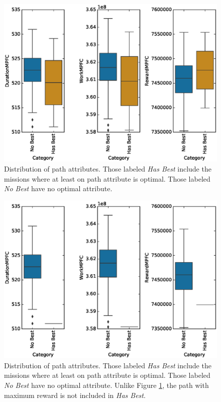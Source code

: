 \documentclass{tamuccthesis}
\begin{document}
\begin{figure}
    \captionsetup{justification=centering}
    \centering
    \includegraphics[width=\textwidth]{EXP4_MPFC_box_r.eps}
    \caption[Distribution of path attributes.]{Distribution of path attributes. Those labeled \textit{Has Best} include the missions where at least on path attribute is optimal. Those labeled \textit{No Best} have no optimal attribute.}
    \label{fig:MPFC_box_withreward}
\end{figure}

\begin{figure}
    \captionsetup{justification=centering}
    \centering
    \includegraphics[width=\textwidth]{EXP4_MPFC_box_nr.eps}
    \caption[Distribution of path attributes, without reward in selecting best candidate solution.]{Distribution of path attributes. Those labeled \textit{Has Best} include the missions where at least on path attribute is optimal. Those labeled \textit{No Best} have no optimal attribute. Unlike Figure \ref{fig:MPFC_box_withreward}, the path with maximum reward is not included in \textit{Has Best}.}
    \label{fig:MPFC_box_noreward}
\end{figure}
\end{document}

